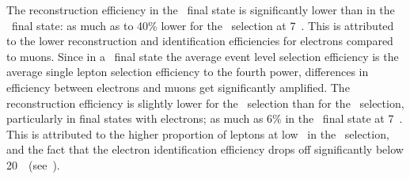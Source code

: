The reconstruction efficiency in the \eeee\ final state is significantly lower
than in the \mmmm\ final state: as much as to 40\% lower for the \ZZs\ selection
at 7~\tev. This is attributed to the lower reconstruction and identification
efficiencies for electrons compared to muons. Since in a \fourlep\ final state
the average event level selection efficiency is the average
single lepton selection efficiency to the fourth power, differences in efficiency between electrons
and muons get significantly amplified. The reconstruction efficiency is 
slightly lower for the \ZZs\ selection than for the \ZZ\ selection, particularly
in final states with electrons; as much as
6\% in the \eeee\ final state at 7~\tev. This is attributed to the higher
proportion of leptons at low \pt\ in the \ZZs\ selection, and the fact that the
electron identification efficiency drops off significantly below
20~\gev\ (see~).


